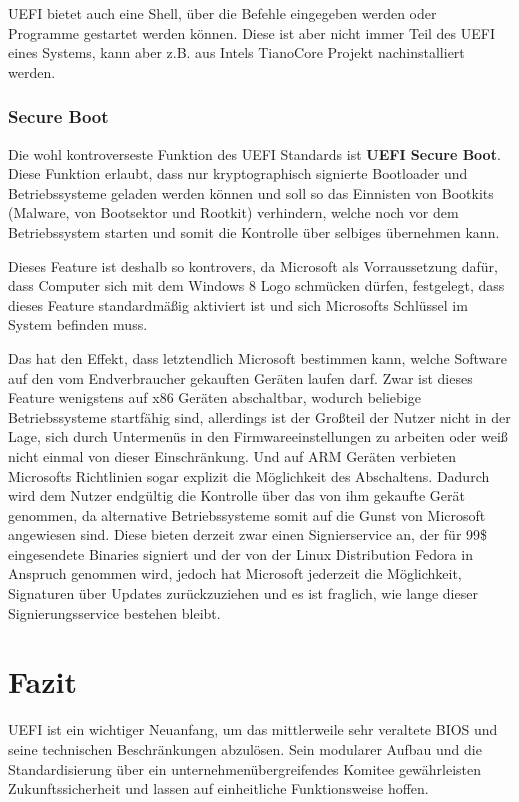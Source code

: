 \documentclass[12pt,ngerman,twopage]{scrartcl}
\begin{document}
UEFI bietet auch eine Shell, über die Befehle eingegeben werden oder Programme gestartet werden können. Diese ist aber nicht immer Teil des UEFI eines Systems, kann aber z.B. aus Intels TianoCore Projekt nachinstalliert werden.
\subsubsection{Secure Boot}
Die wohl kontroverseste Funktion des UEFI Standards ist \textbf{UEFI Secure Boot}. Diese Funktion erlaubt, dass nur kryptographisch signierte Bootloader und Betriebssysteme geladen werden können und soll so das Einnisten von Bootkits (Malware, von Bootsektor und Rootkit) verhindern, welche noch vor dem Betriebssystem starten und somit die Kontrolle über selbiges übernehmen kann.

Dieses Feature ist deshalb so kontrovers, da Microsoft als Vorraussetzung dafür, dass Computer sich mit dem Windows 8 Logo schmücken dürfen, festgelegt, dass dieses Feature standardmäßig aktiviert ist und sich Microsofts Schlüssel im System befinden muss.

Das hat den Effekt, dass letztendlich Microsoft bestimmen kann, welche Software auf den vom Endverbraucher gekauften Geräten laufen darf. Zwar ist dieses Feature wenigstens auf x86 Geräten abschaltbar, wodurch beliebige Betriebssysteme startfähig sind, allerdings ist der Großteil der Nutzer nicht in der Lage, sich durch Untermenüs in den Firmwareeinstellungen zu arbeiten oder weiß nicht einmal von dieser Einschränkung. Und auf ARM Geräten verbieten Microsofts Richtlinien sogar explizit die Möglichkeit des Abschaltens. Dadurch wird dem Nutzer endgültig die Kontrolle über das von ihm gekaufte Gerät genommen, da alternative Betriebssysteme somit auf die Gunst von Microsoft angewiesen sind. Diese bieten derzeit zwar einen Signierservice an, der für 99\$ eingesendete Binaries signiert und der von der Linux Distribution Fedora in Anspruch genommen wird, jedoch hat Microsoft jederzeit die Möglichkeit, Signaturen über Updates zurückzuziehen und es ist fraglich, wie lange dieser Signierungsservice bestehen bleibt.
\section{Fazit}
UEFI ist ein wichtiger Neuanfang, um das mittlerweile sehr veraltete BIOS und seine technischen Beschränkungen abzulösen. Sein modularer Aufbau und die Standardisierung über ein unternehmenübergreifendes Komitee gewährleisten Zukunftssicherheit und lassen auf einheitliche Funktionsweise hoffen.
\end{document}
